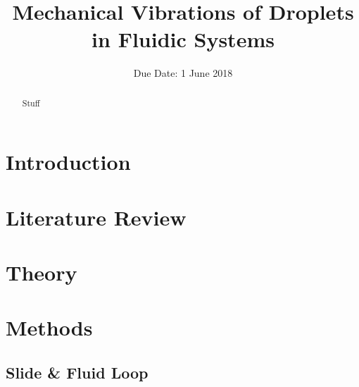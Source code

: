 \documentclass{physics_article_B}
\title{Mechanical Vibrations of Droplets in Fluidic Systems}
\date{Due Date: 1 June 2018}
\begin{document}
	
\setcounter{page}{0}
%

\begin{abstract}
	\large{Stuff
}
\end{abstract}
	

\tableofcontents

\setcounter{page}{1}
	
\newpage
{} 
\setcounter{page}{1}

\newpage

\section{Introduction\label{sect:intro}}

\section{Literature Review\label{sect:litrev}}

\section{Theory\label{sect:theory}}

\section{Methods\label{sect_loop}}

    \subsection{Slide \& Fluid Loop}
    
\end{document}
